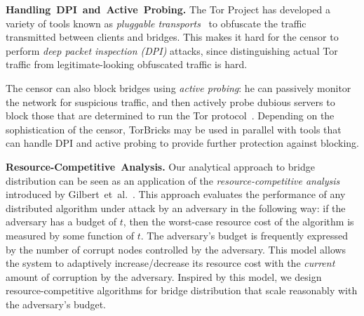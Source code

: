 \documentclass[a4paper,UKenglish]{lipics-v2016}
\newcommand{\etal}{et~al.}
\newcommand{\bricks}{}
\def\bricks/{\mbox{TorBricks}}
\newcommand{\sfsize}{\fontsize{0.68\baselineskip}{0.68\baselineskip}\selectfont}
\newcommand{\sans}[1]{\textbf{\textsf{\sfsize \mbox{#1}}}}
\newcommand{\para}[1]{\vspace{0.55em} \noindent \sans{{\mbox{#1}}}}
\begin{document}
\para{Handling DPI and Active Probing.} The Tor Project has developed a variety of tools known as \emph{pluggable transports}~\cite{Tor:PluggableTransport} to obfuscate the traffic transmitted between clients and bridges. This makes it hard for the censor to perform \emph{deep packet inspection (DPI)} attacks, since distinguishing actual Tor traffic from legitimate-looking obfuscated traffic is hard.

The censor can also block bridges using \emph{active probing}: he can passively monitor the network for suspicious traffic, and then actively probe dubious servers to block those that are determined to run the Tor protocol~\cite{Ensafi2015b}.
Depending on the sophistication of the censor, \bricks/ may be used in parallel with tools that can handle DPI and active probing to provide further protection against blocking.



\para{Resource-Competitive Analysis.} Our analytical approach to bridge distribution can be seen as an application of the \emph{resource-competitive analysis} introduced by Gilbert~\etal~\cite{Gilbert:2012:RAN:2335470.2335471,Bender:2015:SIGACT}. This approach evaluates the performance of any distributed algorithm under attack by an adversary in the following way: if the adversary has a budget of $t$, then the worst-case resource cost of the algorithm is measured by some function of $t$. The adversary's budget is frequently expressed by the number of corrupt nodes controlled by the adversary. This model allows the system to adaptively increase/decrease its resource cost with the \emph{current} amount of corruption by the adversary. Inspired by this model, we design resource-competitive algorithms for bridge distribution that scale reasonably with the adversary's budget.
\end{document}
